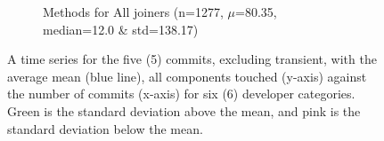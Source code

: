 \begin{figure}
\begin{subfigure}[b]{0.45\textwidth}
    \caption{Methods for All joiners (n=1277, $\mu$=80.35, median=12.0 \& std=138.17)}
    \label{subfig:sections/results/methods/time_series_components_touched_methods_all_joiners_commits_5_pdf}
  \end{subfigure}
\caption[Time Series for all compenents unit:commits category:6 commits:5]{A time series for the five (5) commits, excluding transient, with the average mean (blue line), all components touched (y-axis) against the number of commits (x-axis) for six (6) developer categories. Green is the standard deviation above the mean, and pink is the standard deviation below the mean.} 
    \label{fig:0_codebase_graph_latex_repository_graph_component_time_series_time_series_components_touchedmethods5_5}
\end{figure}
\clearpage 
\newpage 
